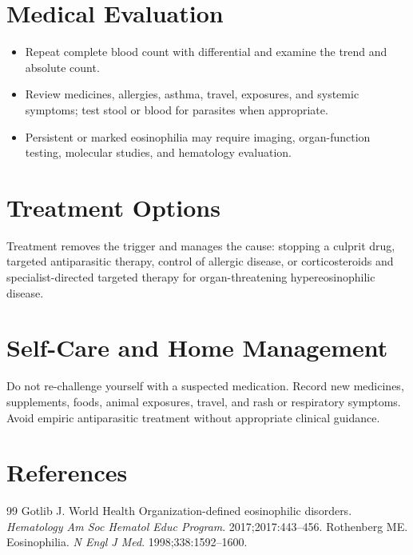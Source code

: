 \section*{Medical Evaluation}
\begin{itemize}
  \item Repeat complete blood count with differential and examine the trend and absolute count.
  \item Review medicines, allergies, asthma, travel, exposures, and systemic symptoms; test stool or blood for parasites when appropriate.
  \item Persistent or marked eosinophilia may require imaging, organ-function testing, molecular studies, and hematology evaluation.
\end{itemize}

\section*{Treatment Options}
Treatment removes the trigger and manages the cause: stopping a culprit drug, targeted antiparasitic therapy, control of allergic disease, or corticosteroids and specialist-directed targeted therapy for organ-threatening hypereosinophilic disease.

\section*{Self-Care and Home Management}
Do not re-challenge yourself with a suspected medication. Record new medicines, supplements, foods, animal exposures, travel, and rash or respiratory symptoms. Avoid empiric antiparasitic treatment without appropriate clinical guidance.

\section*{References}
\begin{thebibliography}{99}
 Gotlib J. World Health Organization-defined eosinophilic disorders. \textit{Hematology Am Soc Hematol Educ Program}. 2017;2017:443--456.
 Rothenberg ME. Eosinophilia. \textit{N Engl J Med}. 1998;338:1592--1600.
\end{thebibliography}
